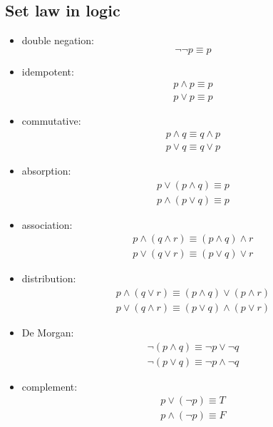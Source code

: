 \documentclass{article}
\begin{document}
\subsection{Set law in logic}
\begin{itemize}
    \item double negation: \[
              \lnot \lnot p \equiv p
          \]
    \item idempotent: \begin{gather*}
              p \land p \equiv p\\
              p \lor p \equiv p
          \end{gather*}
    \item commutative: \begin{gather*}
              p \land q \equiv q \land p\\
              p \lor q \equiv q \lor p
          \end{gather*}
    \item absorption: \begin{gather*}
              p \lor (p \land q) \equiv p\\
              p \land (p \lor q) \equiv  p
          \end{gather*}
    \item association: \begin{gather*}
              p \land ( q \land r) \equiv (p \land q) \land r \\
              p \lor ( q \lor r) \equiv (p \lor q) \lor r
          \end{gather*}
    \item distribution: \begin{gather*}
              p \land ( q \lor r) \equiv (p \land q) \lor (p \land r) \\
              p \lor ( q \land r) \equiv (p \lor q) \land (p \lor r)
          \end{gather*}
    \item De Morgan: \begin{gather*}
              \lnot (p \land q) \equiv \lnot p \lor \lnot q\\
              \lnot (p \lor q) \equiv \lnot p \land \lnot q
          \end{gather*}
    \item complement: \begin{gather*}
              p \lor (\lnot p) \equiv T\\
              p \land (\lnot p ) \equiv F
          \end{gather*}

\end{itemize}
\end{document}
